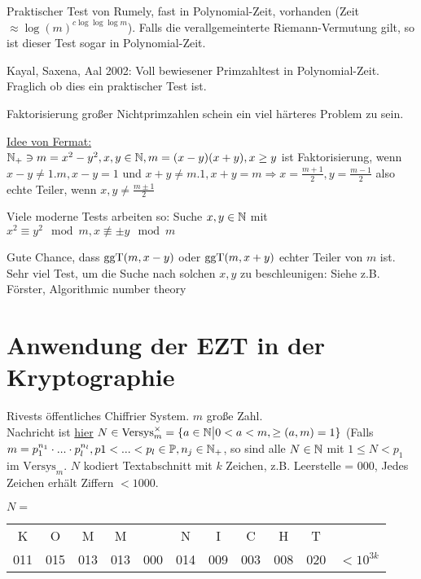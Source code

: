 \documentclass[a4paper,twoside,DIV15,BCOR12mm]{scrbook}
\begin{document}
Praktischer Test von Rumely, fast in Polynomial-Zeit, vorhanden
(Zeit $\approx \log(m)^{c\log \log \log m}$). Falls die
verallgemeinterte Riemann-Vermutung gilt, so ist dieser Test sogar
in Polynomial-Zeit.

Kayal, Saxena, Aal 2002: Voll bewiesener Primzahltest in
Polynomial-Zeit. Fraglich ob dies ein praktischer Test ist.

Faktorisierung großer Nichtprimzahlen schein ein viel härteres
Problem zu sein.

\underline{Idee von Fermat:}\\
$\mathbb{N}_+ \ni m = x^2 - y^2, x,y \in \mathbb{N}, m = (x-y)(x+y), x \ge y$
ist Faktorisierung, wenn $x-y \not= 1.m, x-y = 1$ und $x + y \not=
m.1, x+y = m \Rightarrow x = \frac{m+1}{2}, y = \frac{m-1}{2}$ also
echte Teiler, wenn $x,y \not= \frac{m \pm 1}{2}$

Viele moderne Tests arbeiten so: Suche $x,y \in \mathbb{N}$ mit $x^2
\equiv y^2 \mod m, x \not\equiv \pm y \mod m$

Gute Chance, dass $\mathop{\rm ggT}\nolimits (m, x-y)$ oder $\mathop{\rm ggT}\nolimits (m, x+y)$ echter Teiler
von $m$ ist. Sehr viel Test, um die Suche nach solchen $x,y$ zu
beschleunigen: Siehe z.B. Förster, Algorithmic number theory

\section{Anwendung der EZT in der Kryptographie}
Rivests öffentliches Chiffrier System. $m$ große Zahl.\\
Nachricht ist \underline{hier} $N \in \text{Versys}_m^\times = \{a
\in \mathbb{N} \big| 0 < a < m, \ge (a,m) = 1\}$ (Falls $m =
p_1^{n_1}\cdot ... \cdot p_l^{n_l}, p1 < ... < p_l \in \mathbb{P}, n_j \in
\mathbb{N}_+$, so sind alle $N \in \mathbb{N}$ mit $1 \le N < p_1$ im
$\text{Versys}_m$. $N$ kodiert Textabschnitt mit $k$ Zeichen, z.B.
Leerstelle = $000$, Jedes Zeichen erhält Ziffern $< 1000$.
\begin{beispiel}
    $\text{ }$\\
    $N =$ \begin{tabular}{ccccccccccr}
        K & O & M & M & & N & I & C & H & T & \\
        011 & 015 & 013 & 013 & 000 & 014 & 009 & 003 & 008 & 020 & $< 10^{3k}$
    \end{tabular}
\end{beispiel}
\end{document}
